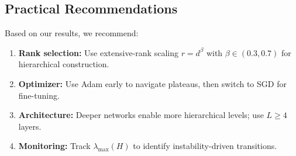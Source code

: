 \subsection{Practical Recommendations}

Based on our results, we recommend:
\begin{enumerate}
    \item \textbf{Rank selection:} Use extensive-rank scaling $r = d^\beta$ with $\beta \in (0.3, 0.7)$ for hierarchical construction.
    \item \textbf{Optimizer:} Use Adam early to navigate plateaus, then switch to SGD for fine-tuning.
    \item \textbf{Architecture:} Deeper networks enable more hierarchical levels; use $L \ge 4$ layers.
    \item \textbf{Monitoring:} Track $\lambda_{\max}(H)$ to identify instability-driven transitions.
\end{enumerate}
